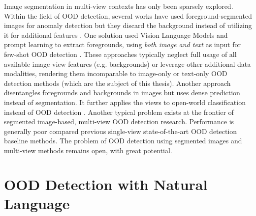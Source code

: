 Image segmentation in multi-view contexts has only been sparsely explored. Within the field of OOD detection, several works have used foreground-segmented images for anomaly detection but they discard the background instead of utilizing it for additional features  \cite{tian2024foct,miyai2024locoop}. One solution used Vision Language Models and prompt learning to extract foregrounds, using \textit{both image and text} as input for few-shot OOD detection \cite{miyai2024locoop}. These approaches typically neglect full usage of all available image view features (e.g. backgrounds) or leverage other additional data modalities, rendering them incomparable to image-only or text-only OOD detection methods (which are the subject of this thesis). Another approach disentangles foregrounds and backgrounds in images but uses dense prediction instead of segmentation. It further applies the views to open-world classification instead of OOD detection \cite{ding2024improving}. Another typical problem exists at the frontier of segmented image-based, multi-view OOD detection research. Performance is generally poor compared previous single-view state-of-the-art OOD detection baseline methods. The problem of OOD detection using segmented images and multi-view methods remains open, with great potential.

\section{OOD Detection with Natural Language}

